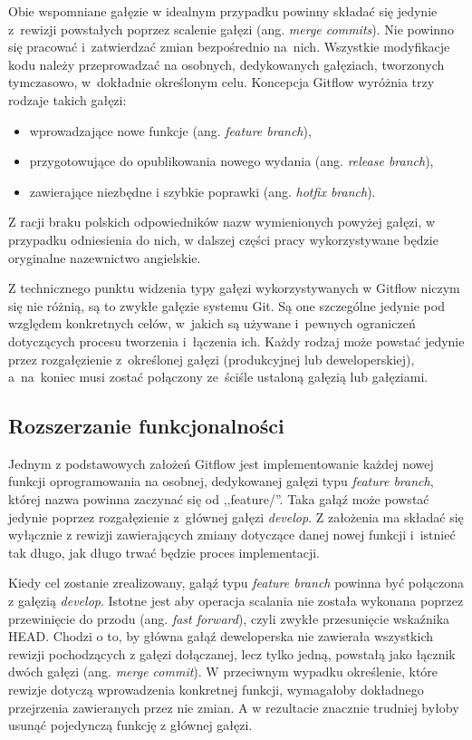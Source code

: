\documentclass[12pt,a4paper,polish,thesis]{dcsbook}
\begin{document}
{	Obie wspomniane gałęzie w idealnym przypadku powinny składać się jedynie z~rewizji powstałych poprzez scalenie gałęzi (ang. \textit{merge commits}). Nie powinno się pracować i~zatwierdzać zmian bezpośrednio na~nich. Wszystkie modyfikacje kodu należy przeprowadzać na osobnych, dedykowanych gałęziach, tworzonych tymczasowo, w~dokładnie określonym celu. Koncepcja Gitflow wyróżnia trzy rodzaje takich gałęzi:
	\begin{itemize}
		\item wprowadzające nowe funkcje (ang. \textit{feature branch}),
		\item przygotowujące do opublikowania nowego wydania (ang. \textit{release branch}),
		\item zawierające niezbędne i szybkie poprawki (ang. \textit{hotfix branch}).
	\end{itemize}
	Z racji braku polskich odpowiedników nazw wymienionych powyżej gałęzi, w przypadku odniesienia do nich, w dalszej części pracy wykorzystywane będzie oryginalne nazewnictwo angielskie.

	Z technicznego punktu widzenia typy gałęzi wykorzystywanych w Gitflow niczym się nie różnią, są to zwykłe gałęzie systemu Git. Są one szczególne jedynie pod względem konkretnych celów, w~jakich są używane i~pewnych ograniczeń dotyczących procesu tworzenia i~łączenia ich. Każdy rodzaj może powstać jedynie przez rozgałęzienie z~określonej gałęzi (produkcyjnej lub deweloperskiej), a~na~koniec musi zostać połączony ze~ściśle ustaloną gałęzią lub gałęziami.

	\subsection{Rozszerzanie funkcjonalności}

	Jednym z podstawowych założeń Gitflow jest implementowanie każdej nowej funkcji oprogramowania na osobnej, dedykowanej gałęzi typu \textit{feature branch}, której nazwa powinna zaczynać się od ,,feature/''. Taka gałąź może powstać jedynie poprzez rozgałęzienie z~głównej gałęzi \textit{develop}. Z założenia ma składać się wyłącznie z rewizji zawierających zmiany dotyczące danej nowej funkcji i~istnieć tak długo, jak długo trwać będzie proces implementacji.

	Kiedy cel zostanie zrealizowany, gałąź typu \textit{feature branch} powinna być połączona z gałęzią \textit{develop}. Istotne jest aby operacja scalania nie została wykonana poprzez przewinięcie do przodu (ang. \textit{fast forward}), czyli zwykłe przesunięcie wskaźnika HEAD. Chodzi o to, by główna gałąź deweloperska nie zawierała wszystkich rewizji pochodzących z gałęzi dołączanej, lecz tylko jedną, powstałą jako łącznik dwóch gałęzi (ang. \textit{merge commit}). W przeciwnym wypadku określenie, które rewizje dotyczą wprowadzenia konkretnej funkcji, wymagałoby dokładnego przejrzenia zawieranych przez nie zmian. A w rezultacie znacznie trudniej byłoby usunąć pojedynczą funkcję z głównej gałęzi.

}
\end{document}
